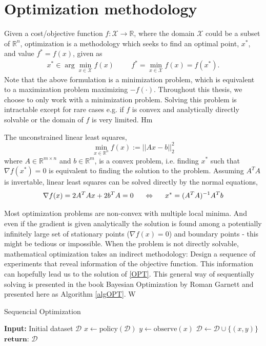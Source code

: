 \chapter{Optimization methodology}
Given a cost/objective function $f: \mathcal{X} \rightarrow \mathbb{R}$, where the domain
$\mathcal{X}$ could be a subset of $\mathbb{R}^n$,
optimization is a methodology which seeks to find an optimal point, $x^*$, and value
$f^* = f(x)$, given as
\begin{align}\label{OPT}
    x^* \in \arg\min_{x \in \mathcal{X}} f(x) \hspace{1cm} f^* = \min_{x \in \mathcal{X}} f(x) = f(x^*).
\end{align}
Note that the above formulation is a minimization problem, which is equivalent to a
maximization problem maximizing $-f(\cdot)$. Throughout this thesis, we choose to only work
with a minimization problem. 
Solving this problem is intractable except for rare cases e.g. if $f$ is 
convex and analytically directly solvable or the domain of $f$ is very limited. Hm

\begin{testexample}
    The unconstrained linear least squares, $$\min_{x\in \mathbb{R}^n} f(x) := ||Ax-b||_2^2$$
    where $A \in \mathbb{R}^{m\times n}$ and $b \in \mathbb{R}^m$, is a convex problem,
    i.e. finding $x^*$ such that $\nabla f(x^*) = 0$ is equivalent to finding the solution
    to the problem. Assuming $A^TA$ is invertable, linear least squares can be solved
    directly by the normal equations, 
    $$\nabla f(x) = 2A^TAx + 2b^TA = 0 \hspace{0.5cm} \Leftrightarrow \hspace{0.5cm} x^* = (A^TA)^{-1} A^Tb$$
\end{testexample}

Most optimization problems are non-convex with multiple local minima. And even if the gradient is
given analytically the solution is found among a potentially infinitely large 
set of stationary points ($\nabla f(x) = 0$) and boundary points - this might be tedious or impossible.
When the problem is not directly solvable, mathematical optimization takes an indirect methodology: 
Design a sequence of experiments that reveal information of the objective function. This information 
can hopefully lead us to the solution of \eqref{OPT}. This general way of sequentially solving 
is presented in the book Bayesian Optimization by Roman Garnett \cite{bayesoptbook} and 
presented here as Algorithm \ref{algOPT}. 
W
\begin{algorithm}
\caption{Sequencial Optimization \cite{bayesoptbook} }\label{algOPT}
\begin{algorithmic}
\State \textbf{Input:} Initial dataset $\mathcal{D}$  
    \State $x \gets \text{policy}(\mathcal{D})$ 
    \State $y \gets \text{observe}(x)$ 
    \State $\mathcal{D} \gets \mathcal{D} \cup \{(x,y)\} $ 
\EndWhile
\State $\textbf{return: } \mathcal{D}$
\end{algorithmic}
\end{algorithm}

